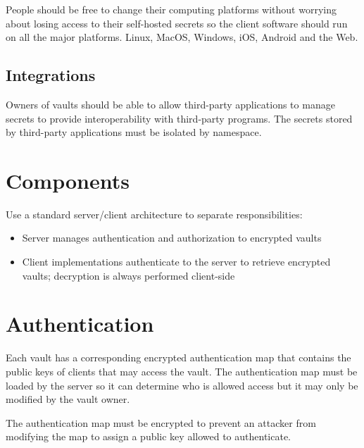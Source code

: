 \documentclass[a4paper,titlepage,oneside]{article}
\renewcommand{\paragraph}{\small}
\begin{document}
\paragraph{People should be free to change their computing platforms without worrying about losing access to their self-hosted secrets so the client software should run on all the major platforms. Linux, MacOS, Windows, iOS, Android and the Web.}

\subsection{Integrations}

\paragraph{Owners of vaults should be able to allow third-party applications to manage secrets to provide interoperability with third-party programs. The secrets stored by third-party applications must be isolated by namespace.}

\section{Components}

Use a standard server/client architecture to separate responsibilities:

\begin{itemize}
  \item Server manages authentication and authorization to encrypted vaults
  \item Client implementations authenticate to the server to retrieve encrypted vaults; decryption is always performed client-side
\end{itemize}

\section{Authentication}

\paragraph{Each vault has a corresponding encrypted authentication map that contains the public keys of clients that may access the vault. The authentication map must be loaded by the server so it can determine who is allowed access but it may only be modified by the vault owner.}

\paragraph{The authentication map must be encrypted to prevent an attacker from modifying the map to assign a public key allowed to authenticate.}
\end{document}
